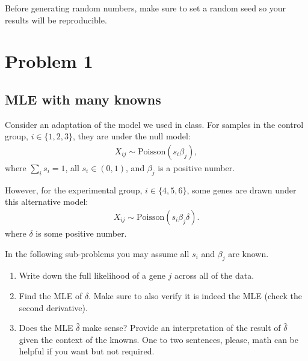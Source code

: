 \usepackage{hyperref}
\usepackage{enumitem}
\usepackage{float}

\usepackage{listings}




\lhead{}


Before generating random numbers, make sure to set a random seed so your results will be reproducible.

\section*{Problem 1}
\subsection*{MLE with many knowns}

Consider an adaptation of the model we used in class.
For samples in the control group, $i \in \{1, 2, 3\}$, they are under the null model:
\begin{align*}
  X_{ij} \sim \text{Poisson}(s_i \beta_j),
\end{align*}
where $\sum_i s_i = 1$, all $s_i \in (0, 1)$, and $\beta_j$ is a positive number.

However, for the experimental group, $i \in \{4, 5, 6\}$, some genes are drawn under this alternative model:
\begin{align*}
  X_{ij} \sim \text{Poisson}(s_i \beta_j \delta).
\end{align*}
where $\delta$ is some positive number.

In the following sub-problems you may assume all $s_i$ and $\beta_j$ are known.


\begin{enumerate}[label=(\alph*)]
  \item Write down the full likelihood of a gene $j$ across all of the data.
  \item Find the MLE of $\delta$. Make sure to also verify it is indeed the MLE (check the second derivative).
  \item Does the MLE $\hat{\delta}$ make sense? Provide an interpretation  of the result of $\hat{\delta}$ given the context of the knowns. One to two sentences, please, math can be helpful if you want but not required.

\end{enumerate}

